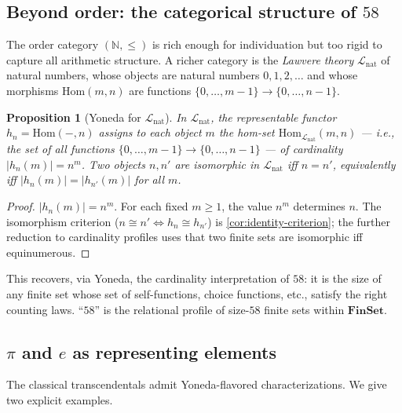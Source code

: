 \documentclass[12pt]{article}
\newtheorem{proposition}[theorem]{Proposition}
\theoremstyle{definition}
\theoremstyle{remark}
\begin{document}
\subsection{Beyond order: the categorical structure of \texorpdfstring{$58$}{58}}

The order category $(\mathbb{N}, \le)$ is rich enough for individuation but too rigid to capture all arithmetic structure. A richer category is the \emph{Lawvere theory} $\mathcal{L}_{\mathrm{nat}}$ of natural numbers, whose objects are natural numbers $0, 1, 2, \ldots$ and whose morphisms $\mathrm{Hom}(m, n)$ are functions $\{0, \ldots, m-1\} \to \{0, \ldots, n-1\}$.

\begin{proposition}[Yoneda for $\mathcal{L}_{\mathrm{nat}}$]
\label{prop:lawvere-yoneda}
In $\mathcal{L}_{\mathrm{nat}}$, the representable functor $h_n = \mathrm{Hom}(-, n)$ assigns to each object $m$ the hom-set $\mathrm{Hom}_{\mathcal{L}_{\mathrm{nat}}}(m, n)$ --- i.e., the set of all functions $\{0, \ldots, m-1\} \to \{0, \ldots, n-1\}$ --- of cardinality $|h_n(m)| = n^m$. Two objects $n, n'$ are isomorphic in $\mathcal{L}_{\mathrm{nat}}$ iff $n = n'$, equivalently iff $|h_n(m)| = |h_{n'}(m)|$ for all $m$.
\end{proposition}

\begin{proof}
$|h_n(m)| = n^m$. For each fixed $m \ge 1$, the value $n^m$ determines $n$. The isomorphism criterion ($n \cong n' \iff h_n \cong h_{n'}$) is \cref{cor:identity-criterion}; the further reduction to cardinality profiles uses that two finite sets are isomorphic iff equinumerous.
\end{proof}

This recovers, via Yoneda, the cardinality interpretation of $58$: it is the size of any finite set whose set of self-functions, choice functions, etc., satisfy the right counting laws. ``$58$'' is the relational profile of size-$58$ finite sets within $\mathbf{FinSet}$.

\subsection{\texorpdfstring{$\pi$ and $e$}{pi and e} as representing elements}
\label{subsec:pi-e}

The classical transcendentals admit Yoneda-flavored characterizations. We give two explicit examples.
\end{document}
